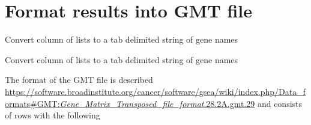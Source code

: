 \documentclass[
]{book}
\newenvironment{Shaded}{\begin{snugshade}}{\end{snugshade}}
\newcommand{\AttributeTok}[1]{\textcolor[rgb]{0.77,0.63,0.00}{#1}}
\newcommand{\ControlFlowTok}[1]{\textcolor[rgb]{0.13,0.29,0.53}{\textbf{#1}}}
\newcommand{\DecValTok}[1]{\textcolor[rgb]{0.00,0.00,0.81}{#1}}
\newcommand{\FunctionTok}[1]{\textcolor[rgb]{0.00,0.00,0.00}{#1}}
\newcommand{\NormalTok}[1]{#1}
\newcommand{\OtherTok}[1]{\textcolor[rgb]{0.56,0.35,0.01}{#1}}
\newcommand{\SpecialCharTok}[1]{\textcolor[rgb]{0.00,0.00,0.00}{#1}}
\newcommand{\StringTok}[1]{\textcolor[rgb]{0.31,0.60,0.02}{#1}}
\begin{document}
\hypertarget{format-results-into-gmt-file}{%
\section{Format results into GMT file}\label{format-results-into-gmt-file}}

Convert column of lists to a tab delimited string of gene names

\begin{Shaded}
\end{Shaded}

Convert column of lists to a tab delimited string of gene names

\begin{Shaded}
\end{Shaded}

The format of the GMT file is described \href{here}{https://software.broadinstitute.org/cancer/software/gsea/wiki/index.php/Data\_formats\#GMT:\emph{Gene\_Matrix\_Transposed\_file\_format}.28.2A.gmt.29} and consists of rows with the following
\end{document}
